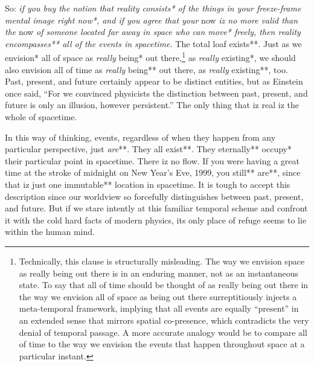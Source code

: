 \documentclass[12pt]{book}
\begin{document}
So: \textit{if you buy the notion that reality consists* of the things in your freeze-frame mental image right now*, and if you agree that your} now \textit{iz no more valid than the} now \textit{of someone located far away in space who can move* freely, then reality encompasses** all of the events in spacetime.} The total loaf exists**. Just as we envision* all of space as \textit{really} being* out there,\footnote{Technically, this clause is structurally misleading. The way we envision space as really being out there is in an enduring manner, not as an instantaneous state. To say that all of time should be thought of as really being out there in the way we envision all of space as being out there surreptitiously injects a meta-temporal framework, implying that all events are equally ``present'' in an extended sense that mirrors spatial co-presence, which contradicts the very denial of temporal passage. A more accurate analogy would be to compare all of time to the way we envision the events that happen throughout space at a particular instant.} as \textit{really} existing*, we should also envision all of time as \textit{really} being** out there, as \textit{really} existing**, too. Past, present, and future certainly appear to be distinct entities, but as Einstein once said, ``For we convinced physicists the distinction between past, present, and future is only an illusion, however persistent.'' The only thing that iz real iz the whole of spacetime.

In this way of thinking, events, regardless of when they happen from any particular perspective, just \textit{are}**. They all exist**. They eternally** occupy* their particular point in spacetime. There iz no flow. If you were having a great time at the stroke of midnight on New Year's Eve, 1999, you still** are**, since that iz just one immutable** location in spacetime. It is tough to accept this description since our worldview so forcefully distinguishes between past, present, and future. But if we stare intently at this familiar temporal scheme and confront it with the cold hard facts of modern physics, its only place of refuge seems to lie within the human mind.
\end{document}
